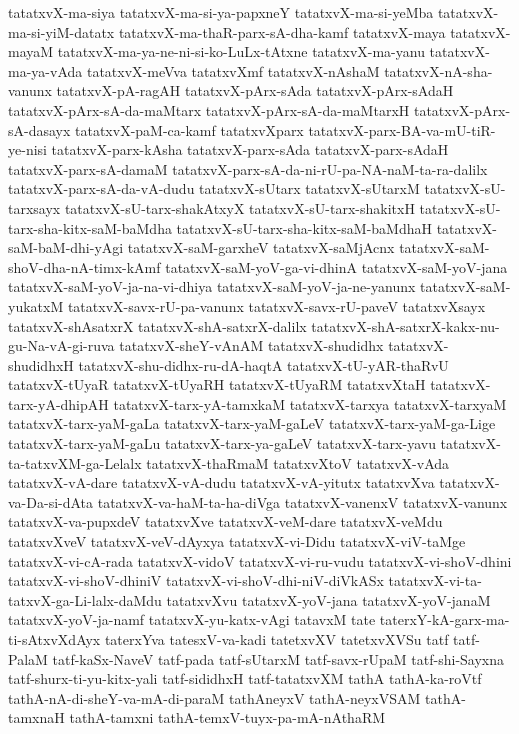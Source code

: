 {tatatxvX-ma-siya
tatatxvX-ma-si-ya-papxneY
tatatxvX-ma-si-yeMba
tatatxvX-ma-si-yiM-datatx
tatatxvX-ma-thaR-parx-sA-dha-kamf
tatatxvX-maya
tatatxvX-mayaM
tatatxvX-ma-ya-ne-ni-si-ko-LuLx-tAtxne
tatatxvX-ma-yanu
tatatxvX-ma-ya-vAda
tatatxvX-meVva
tatatxvXmf
tatatxvX-nAshaM
tatatxvX-nA-sha-vanunx
tatatxvX-pA-ragAH
tatatxvX-pArx-sAda
tatatxvX-pArx-sAdaH
tatatxvX-pArx-sA-da-maMtarx
tatatxvX-pArx-sA-da-maMtarxH
tatatxvX-pArx-sA-dasayx
tatatxvX-paM-ca-kamf
tatatxvXparx
tatatxvX-parx-BA-va-mU-tiR-ye-nisi
tatatxvX-parx-kAsha
tatatxvX-parx-sAda
tatatxvX-parx-sAdaH
tatatxvX-parx-sA-damaM
tatatxvX-parx-sA-da-ni-rU-pa-NA-naM-ta-ra-dalilx
tatatxvX-parx-sA-da-vA-dudu
tatatxvX-sUtarx
tatatxvX-sUtarxM
tatatxvX-sU-tarxsayx
tatatxvX-sU-tarx-shakAtxyX
tatatxvX-sU-tarx-shakitxH
tatatxvX-sU-tarx-sha-kitx-saM-baMdha
tatatxvX-sU-tarx-sha-kitx-saM-baMdhaH
tatatxvX-saM-baM-dhi-yAgi
tatatxvX-saM-garxheV
tatatxvX-saMjAcnx
tatatxvX-saM-shoV-dha-nA-timx-kAmf
tatatxvX-saM-yoV-ga-vi-dhinA
tatatxvX-saM-yoV-jana
tatatxvX-saM-yoV-ja-na-vi-dhiya
tatatxvX-saM-yoV-ja-ne-yanunx
tatatxvX-saM-yukatxM
tatatxvX-savx-rU-pa-vanunx
tatatxvX-savx-rU-paveV
tatatxvXsayx
tatatxvX-shAsatxrX
tatatxvX-shA-satxrX-dalilx
tatatxvX-shA-satxrX-kakx-nu-gu-Na-vA-gi-ruva
tatatxvX-sheY-vAnAM
tatatxvX-shudidhx
tatatxvX-shudidhxH
tatatxvX-shu-didhx-ru-dA-haqtA
tatatxvX-tU-yAR-thaRvU
tatatxvX-tUyaR
tatatxvX-tUyaRH
tatatxvX-tUyaRM
tatatxvXtaH
tatatxvX-tarx-yA-dhipAH
tatatxvX-tarx-yA-tamxkaM
tatatxvX-tarxya
tatatxvX-tarxyaM
tatatxvX-tarx-yaM-gaLa
tatatxvX-tarx-yaM-gaLeV
tatatxvX-tarx-yaM-ga-Lige
tatatxvX-tarx-yaM-gaLu
tatatxvX-tarx-ya-gaLeV
tatatxvX-tarx-yavu
tatatxvX-ta-tatxvXM-ga-Lelalx
tatatxvX-thaRmaM
tatatxvXtoV
tatatxvX-vAda
tatatxvX-vA-dare
tatatxvX-vA-dudu
tatatxvX-vA-yitutx
tatatxvXva
tatatxvX-va-Da-si-dAta
tatatxvX-va-haM-ta-ha-diVga
tatatxvX-vanenxV
tatatxvX-vanunx
tatatxvX-va-pupxdeV
tatatxvXve
tatatxvX-veM-dare
tatatxvX-veMdu
tatatxvXveV
tatatxvX-veV-dAyxya
tatatxvX-vi-Didu
tatatxvX-viV-taMge
tatatxvX-vi-cA-rada
tatatxvX-vidoV
tatatxvX-vi-ru-vudu
tatatxvX-vi-shoV-dhini
tatatxvX-vi-shoV-dhiniV
tatatxvX-vi-shoV-dhi-niV-diVkASx
tatatxvX-vi-ta-tatxvX-ga-Li-lalx-daMdu
tatatxvXvu
tatatxvX-yoV-jana
tatatxvX-yoV-janaM
tatatxvX-yoV-ja-namf
tatatxvX-yu-katx-vAgi
tatavxM
tate
taterxY-kA-garx-ma-ti-sAtxvXdAyx
taterxYva
tatesxV-va-kadi
tatetxvXV
tatetxvXVSu
tatf
tatf-PalaM
tatf-kaSx-NaveV
tatf-pada
tatf-sUtarxM
tatf-savx-rUpaM
tatf-shi-Sayxna
tatf-shurx-ti-yu-kitx-yali
tatf-sididhxH
tatf-tatatxvXM
tathA
tathA-ka-roVtf
tathA-nA-di-sheY-va-mA-di-paraM
tathAneyxV
tathA-neyxVSAM
tathA-tamxnaH
tathA-tamxni
tathA-temxV-tuyx-pa-mA-nAthaRM
}
